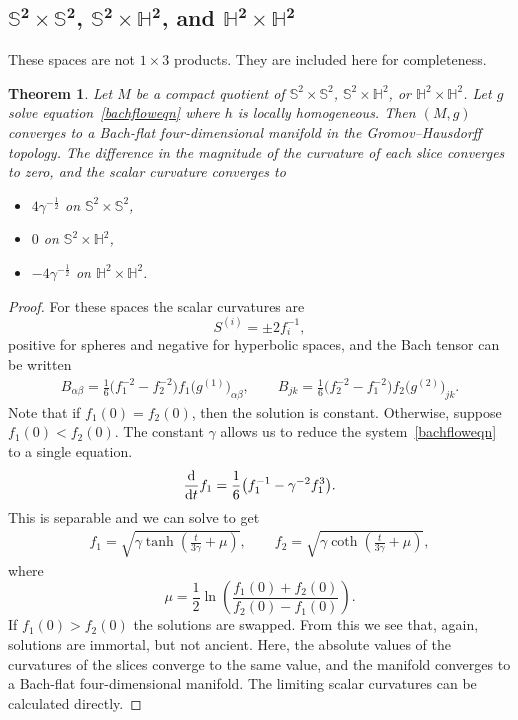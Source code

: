 \documentclass[pdftex]{sigma}
\numberwithin{equation}{section}
\newtheorem{Theorem}{Theorem}[section]
\newcommand{\dtime}{\frac{{\rm d}}{{\rm d} t}} %
\begin{document}
\subsection[$\mathbb{S}^2 \times \mathbb{S}^2$, $\mathbb{S}^2 \times \mathbb{H}^2$, and $\mathbb{H}^2 \times \mathbb{H}^2$]{$\boldsymbol{\mathbb{S}^2 \times \mathbb{S}^2}$, $\boldsymbol{\mathbb{S}^2 \times \mathbb{H}^2}$, and $\boldsymbol{\mathbb{H}^2 \times \mathbb{H}^2}$}

These spaces are not $1 \times 3$ products. They are included here for completeness.

\begin{Theorem}Let $M$ be a compact quotient of $\mathbb{S}^2 \times \mathbb{S}^2$, $\mathbb{S}^2 \times \mathbb{H}^2$, or $\mathbb{H}^2 \times \mathbb{H}^2$. Let $g$ solve equation~\eqref{bachfloweqn} where $h$ is locally homogeneous. Then $(M, g)$ converges to a Bach-flat four-dimensional manifold in the Gromov--Hausdorff topology. The difference in the magnitude of the curvature of each slice converges to zero, and the scalar curvature converges to
\begin{itemize}\itemsep=0pt
\item $4 \gamma^{-\frac{1}{2}}$ on $\mathbb{S}^2 \times \mathbb{S}^2$,
\item $0$ on $\mathbb{S}^2 \times \mathbb{H}^2$,
\item $-4 \gamma^{-\frac{1}{2}}$ on $\mathbb{H}^2 \times \mathbb{H}^2$.
\end{itemize}
\end{Theorem}

\begin{proof}For these spaces the scalar curvatures are
\[
S^{(i)} = \pm 2 f_i^{-1},
\]
positive for spheres and negative for hyperbolic spaces, and the Bach tensor can be written
\begin{gather*}
B_{\alpha \beta} = \frac{1}{6} \big(f_1^{-2} - f_2^{-2}\big) f_1 \big(g^{(1)}\big)_{\alpha \beta}, \qquad
B_{jk} = \frac{1}{6} \big(f_2^{-2} - f_1^{-2}\big) f_2 \big(g^{(2)}\big)_{jk}.
\end{gather*}
Note that if $f_1(0) = f_2(0)$, then the solution is constant. Otherwise, suppose $f_1(0) < f_2(0)$. The constant $\gamma$ allows us to reduce the system~\eqref{bachfloweqn} to a single equation.
\[
\dtime f_1 = \frac{1}{6}\big(f_1^{-1} - \gamma^{-2} f_1^3\big).
\]
This is separable and we can solve to get
\begin{gather*}
f_1 = \sqrt{\gamma \tanh \left(\frac{t}{3\gamma} + \mu \right)},\qquad
f_2 = \sqrt{\gamma \coth \left(\frac{t}{3\gamma} + \mu \right)},
\end{gather*}
where
\[
\mu = \frac{1}{2} \ln \left(\frac{f_1(0) + f_2(0)}{f_2(0) - f_1(0)} \right).
\]
If $f_1(0) > f_2(0)$ the solutions are swapped. From this we see that, again, solutions are immortal, but not ancient. Here, the absolute values of the curvatures of the slices converge to the same value, and the manifold converges to a Bach-flat four-dimensional manifold. The limiting scalar curvatures can be calculated directly.
\end{proof}
\end{document}
